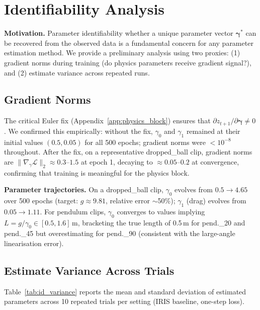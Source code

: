\documentclass[runningheads]{llncs}
\begin{document}
\section{Identifiability Analysis}
\label{app:identifiability}

\textbf{Motivation.}  Parameter identifiability whether a unique
parameter vector $\boldsymbol{\gamma}^*$ can be recovered from the observed
data is a fundamental concern for any parameter estimation method.  We
provide a preliminary analysis using two proxies: (1) gradient norms during
training (do physics parameters receive gradient signal?), and (2) estimate
variance across repeated runs.

\subsection{Gradient Norms}
\label{app:grad_norms}

The critical Euler fix (Appendix~\ref{app:physics_block}) ensures that
$\partial z_{t+1}/\partial\boldsymbol{\gamma} \neq 0$.  We confirmed this
empirically: without the fix, $\gamma_0$ and $\gamma_1$ remained at their
initial values $(0.5, 0.05)$ for all 500 epochs; gradient norms were
$< 10^{-8}$ throughout.  After the fix, on a representative dropped\_ball
clip, gradient norms are $\|\nabla_\gamma \mathcal{L}\|_2 \approx 0.3$--$1.5$
at epoch 1, decaying to $\approx 0.05$--$0.2$ at convergence, confirming
that training is meaningful for the physics block.

\textbf{Parameter trajectories.}  On a dropped\_ball clip, $\gamma_0$
evolves from $0.5 \to 4.65$ over 500 epochs (target: $g \approx 9.81$,
relative error $\sim$50\%); $\gamma_1$ (drag) evolves from $0.05 \to 1.11$.
For pendulum clips, $\gamma_0$ converges to values implying
$L = g/\gamma_0 \in [0.5, 1.6]$\,m, bracketing the true length of 0.5\,m
for pend.\_20 and pend.\_45 but overestimating for pend.\_90 (consistent
with the large-angle linearisation error).

\subsection{Estimate Variance Across Trials}
\label{app:id_variance}

Table~\ref{tab:id_variance} reports the mean and standard deviation of
estimated parameters across 10 repeated trials per setting (IRIS baseline,
one-step loss).
\end{document}
